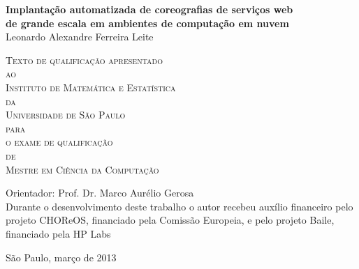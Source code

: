 \documentclass[11pt,twoside,a4paper]{book}
\begin{document}
\frontmatter 
\fancyhead[RO]{{\footnotesize\rightmark}\hspace{2em}\thepage}
\setcounter{tocdepth}{2}
\fancyhead[LE]{\thepage\hspace{2em}\footnotesize{\leftmark}}
\fancyhead[RE,LO]{}
\fancyhead[RO]{{\footnotesize\rightmark}\hspace{2em}\thepage}

\onehalfspacing  %

\thispagestyle{empty}
\begin{center}
    \vspace*{2.3cm}
    \textbf{\Large{Implantação automatizada de coreografias de serviços web \\
    de grande escala em ambientes de computação em nuvem}}\\
    
    \vspace*{1.2cm}
    \Large{Leonardo Alexandre Ferreira Leite}
    
    \vskip 2cm
    \textsc{
    Texto de qualificação apresentado\\[-0.25cm] 
    ao\\[-0.25cm]
    Instituto de Matemática e Estatística\\[-0.25cm]
    da\\[-0.25cm]
    Universidade de São Paulo\\[-0.25cm]
    para\\[-0.25cm]
    o exame de qualificação\\[-0.25cm]
    de\\[-0.25cm]
    Mestre em Ciência da Computação}
    
    \vskip 1.5cm
    Orientador: Prof. Dr. Marco Aurélio Gerosa\\

   	\vskip 1cm
    \normalsize{Durante o desenvolvimento deste trabalho o autor recebeu auxílio
    financeiro pelo projeto CHOReOS, financiado pela Comissão Europeia, e pelo projeto Baile, financiado pela HP Labs}
    
    \vskip 0.5cm
    \normalsize{São Paulo, março de 2013}
\end{center}
\end{document}
